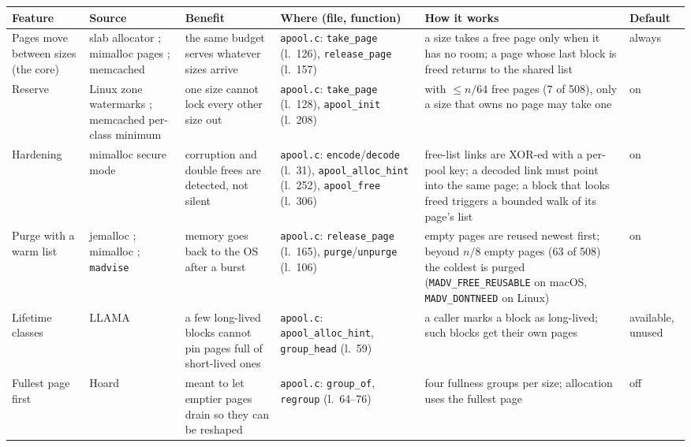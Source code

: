 \documentclass[10.5pt,a4paper]{article}
\newcommand{\file}[1]{\texttt{\small #1}}
\newcommand{\fn}[1]{\texttt{\small #1}}
\begin{document}
\begin{table}[ht]
\centering
\footnotesize
\begin{tabularx}{\textwidth}{@{}L{2.25cm}L{2.3cm}YL{3.35cm}YL{1.15cm}@{}}
\toprule
Feature & Source & Benefit & Where (file, function) & How it works & Default \\
\midrule
Pages move between sizes (the core) & slab allocator \citep{bonwick1994slab}; mimalloc pages \citep{leijen2019mimalloc}; memcached \citep{memcached1411} & the same budget serves whatever sizes arrive & \file{apool.c}: \fn{take\_page} (l.~126), \fn{release\_page} (l.~157) & a size takes a free page only when it has no room; a page whose last block is freed returns to the shared list & always \\
Reserve & Linux zone watermarks \citep{gorman2004vmm}; memcached per-class minimum \citep{memcached1411} & one size cannot lock every other size out & \file{apool.c}: \fn{take\_page} (l.~128), \fn{apool\_init} (l.~208) & with $\le n/64$ free pages (7 of 508), only a size that owns no page may take one & on \\
Hardening & mimalloc secure mode \citep{leijen2019mimalloc} & corruption and double frees are detected, not silent & \file{apool.c}: \fn{encode}/\fn{decode} (l.~31), \fn{apool\_alloc\_hint} (l.~252), \fn{apool\_free} (l.~306) & free-list links are XOR-ed with a per-pool key; a decoded link must point into the same page; a block that looks freed triggers a bounded walk of its page's list & on \\
Purge with a warm list & jemalloc \citep{evans2006jemalloc}; mimalloc \citep{leijen2019mimalloc}; \texttt{madvise} \citep{linuxmadvise,xnumman} & memory goes back to the OS after a burst & \file{apool.c}: \fn{release\_page} (l.~165), \fn{purge}/\fn{unpurge} (l.~106) & empty pages are reused newest first; beyond $n/8$ empty pages (63 of 508) the coldest is purged (\texttt{MADV\_FREE\_REUSABLE} on macOS, \texttt{MADV\_DONTNEED} on Linux) & on \\
Lifetime classes & LLAMA \citep{maas2020llama} & a few long-lived blocks cannot pin pages full of short-lived ones & \file{apool.c}: \fn{apool\_alloc\_hint}, \fn{group\_head} (l.~59) & a caller marks a block as long-lived; such blocks get their own pages & available, unused \\
Fullest page first & Hoard \citep{berger2000hoard} & meant to let emptier pages drain so they can be reshaped & \file{apool.c}: \fn{group\_of}, \fn{regroup} (l.~64--76) & four fullness groups per size; allocation uses the fullest page & off \\

\end{tabularx}
\end{table}
\end{document}
